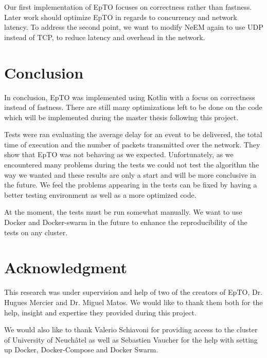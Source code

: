 \documentclass[10pt,conference,a4paper]{IEEEtran}
\begin{document}
Our first implementation of EpTO focuses on correctness rather than fastness. Later work should optimize EpTO in regards to concurrency and network latency. To address the second point, we want to modify NeEM again to use UDP instead of TCP, to reduce latency and overhead in the network.
\section{Conclusion}
In conclusion, EpTO was implemented using Kotlin with a focus on correctness instead of fastness. There are still many optimizations left to be done on the code which will be implemented during the master thesis following this project.
\par
Tests were ran evaluating  the average delay for an event to be delivered, the total time of execution and the number of packets transmitted over the network. They show that EpTO was not behaving as we expected. Unfortunately, as we encountered many problems during the tests we could not test the algorithm the way we wanted and these results are only a start and will be more conclusive in the future. We feel the problems appearing in the tests can be fixed by having a better testing environment as well as a more optimized code.
\par
At the moment, the tests must be run somewhat manually. We want to use Docker and Docker-swarm in the future to enhance the reproducibility of the tests on any cluster.


\section*{Acknowledgment}
This research was under supervision and help of two of the creators of EpTO, Dr. Hugues Mercier and Dr. Miguel Matos. We would like to thank them both for the help, insight and expertise they provided during this project.
\par
We would also like to thank Valerio Schiavoni for providing access to the cluster of University of Neuchâtel as well as Sebastien Vaucher for the help with setting up Docker, Docker-Compose and Docker Swarm.




\begin{otherlanguage}{australian}
\printbibliography
\end{otherlanguage}

\end{document}
